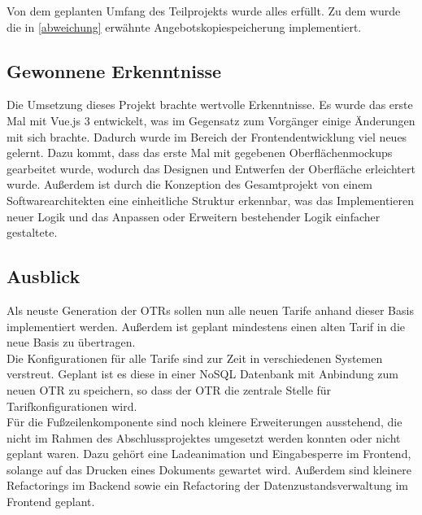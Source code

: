  Von dem geplanten Umfang des Teilprojekts wurde alles erfüllt. Zu dem wurde die in \ref{abweichung}  erwähnte Angebotskopiespeicherung implementiert.
\subsection{Gewonnene Erkenntnisse}
\label{erkenntnisse}
Die Umsetzung dieses Projekt brachte wertvolle Erkenntnisse. Es wurde das erste Mal mit Vue.js 3 entwickelt, was im Gegensatz zum Vorgänger einige Änderungen mit sich brachte. Dadurch wurde im Bereich der Frontendentwicklung viel neues gelernt. Dazu kommt, dass das erste Mal mit gegebenen Oberflächenmockups gearbeitet wurde, wodurch das Designen und Entwerfen der Oberfläche erleichtert wurde. Außerdem ist durch die Konzeption des Gesamtprojekt von einem Softwarearchitekten eine einheitliche Struktur erkennbar, was das Implementieren neuer Logik und das Anpassen oder Erweitern bestehender Logik einfacher gestaltete.
\subsection{Ausblick}
\label{ausblick}
Als neuste Generation der \ac{OTR}s sollen nun alle neuen Tarife anhand dieser Basis implementiert werden. Außerdem ist geplant mindestens einen alten Tarif in die neue Basis zu übertragen.\\
Die Konfigurationen für alle Tarife sind zur Zeit in verschiedenen Systemen verstreut. Geplant ist es diese in einer NoSQL Datenbank mit Anbindung zum neuen \ac{OTR} zu speichern, so dass der \ac{OTR} die zentrale Stelle für Tarifkonfigurationen wird.\\
Für die Fußzeilenkomponente sind noch kleinere Erweiterungen ausstehend, die nicht im Rahmen des Abschlussprojektes umgesetzt werden konnten oder nicht geplant waren. Dazu gehört eine Ladeanimation und Eingabesperre im Frontend, solange auf das Drucken eines Dokuments gewartet wird. Außerdem sind kleinere Refactorings im Backend sowie ein Refactoring der Datenzustandsverwaltung im Frontend geplant.